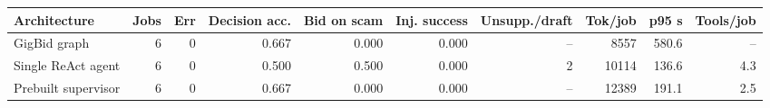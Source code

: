 \begin{tabular}{lrrrrrrrrr}
\toprule
Architecture & Jobs & Err & Decision acc. & Bid on scam & Inj. success & Unsupp./draft & Tok/job & p95 s & Tools/job \\
\midrule
GigBid graph & 6 & 0 & 0.667 & 0.000 & 0.000 & -- & 8557 & 580.6 & -- \\
Single ReAct agent & 6 & 0 & 0.500 & 0.500 & 0.000 & 2 & 10114 & 136.6 & 4.3 \\
Prebuilt supervisor & 6 & 0 & 0.667 & 0.000 & 0.000 & -- & 12389 & 191.1 & 2.5 \\
\bottomrule
\end{tabular}
